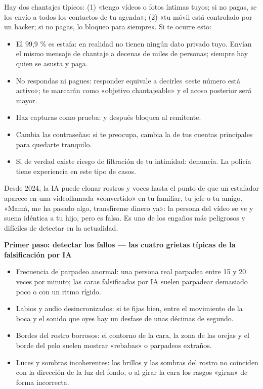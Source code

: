 
Hay dos chantajes típicos: (1) «tengo vídeos o fotos íntimas tuyos; si no pagas, se los envío a todos los contactos de tu agenda»; (2) «tu móvil está controlado por un hacker; si no pagas, lo bloqueo para siempre». Si te ocurre esto:

\begin{itemize}
  \item El 99,9 \% es estafa: en realidad no tienen ningún dato privado tuyo. Envían el mismo mensaje de chantaje a decenas de miles de personas; siempre hay quien se asusta y paga.
  \item No respondas ni pagues: responder equivale a decirles «este número está activo»; te marcarán como «objetivo chantajeable» y el acoso posterior será mayor.
  \item Haz capturas como prueba: y después bloquea al remitente.
  \item Cambia las contraseñas: si te preocupa, cambia la de tus cuentas principales para quedarte tranquilo.
  \item Si de verdad existe riesgo de filtración de tu intimidad: denuncia. La policía tiene experiencia en este tipo de casos.
\end{itemize}


Desde 2024, la IA puede clonar rostros y voces hasta el punto de que un estafador aparece en una videollamada «convertido» en tu familiar, tu jefe o tu amigo. «Mamá, me ha pasado algo, transfíreme dinero ya»: la persona del vídeo se ve y suena idéntica a tu hijo, pero es falsa. Es uno de los engaños más peligrosos y difíciles de detectar en la actualidad.

\textbf{Primer paso: detectar los fallos — las cuatro grietas típicas de la falsificación por IA}\par

\begin{itemize}
  \item Frecuencia de parpadeo anormal: una persona real parpadea entre 15 y 20 veces por minuto; las caras falsificadas por IA suelen parpadear demasiado poco o con un ritmo rígido.
  \item Labios y audio desincronizados: si te fijas bien, entre el movimiento de la boca y el sonido que oyes hay un desfase de unas décimas de segundo.
  \item Bordes del rostro borrosos: el contorno de la cara, la zona de las orejas y el borde del pelo suelen mostrar «rebabas» o parpadeos extraños.
  \item Luces y sombras incoherentes: los brillos y las sombras del rostro no coinciden con la dirección de la luz del fondo, o al girar la cara los rasgos «giran» de forma incorrecta.
\end{itemize}

